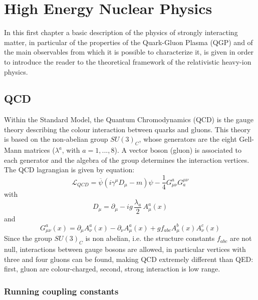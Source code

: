 \chapter{High Energy Nuclear Physics}
%
In this first chapter a basic description of the physics of strongly interacting matter, in particular of the properties of the Quark-Gluon Plasma (QGP) and of the main observables from which it is possible to characterize it, is given in order to introduce the reader to the theoretical framework of the relativistic heavy-ion physics.
%
\section{QCD}
Within the Standard Model, the Quantum Chromodynamics (QCD) is the gauge theory describing the colour interaction between quarks and gluons. This theory is based on the non-abelian group $SU(3)_{C}$, whose generators are the eight Gell-Mann matrices ($\lambda^{a}$, with $a=1,...,8$). A vector boson (gluon) is associated to each generator and the algebra of the group determines the interaction vertices.\\
The QCD lagrangian is given by equation:
%
\begin{equation}
 \label{lQCD}
 \mathcal{L}_{QCD} = \overbar{\psi}(i\gamma^{\mu}D_{\mu}-m)\psi - \frac{1}{4} G^{a}_{\mu\nu}G_{a}^{\mu\nu}
\end{equation}
%
with
%
\begin{equation*}
  D_{\mu} = \partial_{\mu} - i g \, \frac{\lambda_{a}}{2} \, A^{a}_{\mu}(x)
\end{equation*}
%
and
%
\begin{equation*}
  G^{a}_{\mu\nu}(x)=\partial_{\mu}A^{a}_{\nu}(x)-\partial_{\nu}A^{a}_{\mu}(x)+ g f_{abc} A^{b}_{\mu}(x)A^{c}_{\nu}(x)
\end{equation*}
%
Since the group $SU(3)_{C}$ is non abelian, i.e. the structure constants $f_{abc}$ are not null, interactions between gauge bosons are allowed, in particular vertices with three and four gluons can be found, making QCD extremely different than QED: first, gluon are colour-charged, second, strong interaction is low range.

\subsection{Running coupling constants}

